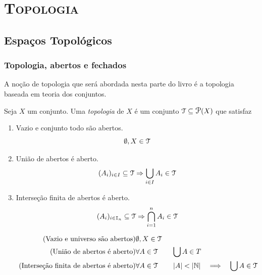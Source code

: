 \part{{\scshape Topologia}}

\chapter{Espaços Topológicos}

\section{Topologia, abertos e fechados}

	A noção de topologia que será abordada nesta parte do livro é a topologia baseada em teoria dos conjuntos.

\begin{defi}
	Seja $X$ um conjunto. Uma \emph{topologia} de $X$ é um conjunto $\topo \subseteq \p(X)$ que satisfaz
	\begin{enumerate}
	\item Vazio e conjunto todo são abertos.
	\begin{equation*}
	\emptyset, X \in \mathcal{T}
	\end{equation*}

	\item União de abertos é aberto.
	\begin{equation*}
	(A_i)_{i \in I} \subseteq \mathcal{T} \Rightarrow \displaystyle\bigcup_{i \in I} A_i \in \mathcal{T}
	\end{equation*}

	\item Interseção finita de abertos é aberto.
	\begin{equation*}
	(A_i)_{i \in \mathtt I_n} \subseteq \mathcal T \Rightarrow \displaystyle\bigcap_{i=1}^n A_i \in \mathcal{T}
	\end{equation*}
	\end{enumerate}
	
	\begin{align*}
	\tag{Vazio e universo são abertos} &\emptyset, X \in \mathcal{T} \\
	\tag{União de abertos é aberto} &\forall A \in \mathcal{T} \qquad \bigcup A \in T \\
	\tag{Interseção finita de abertos é aberto} &\forall A \in \mathcal{T} \qquad \left\vert{A}\right\vert < \left\vert{\mathbb{N}}\right\vert \quad \Longrightarrow \quad \bigcup A \in \mathcal{T}
	\end{align*}
\end{defi}

